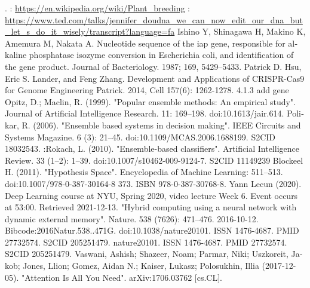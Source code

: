 \documentclass[12pt,a4paper,BCOR=.7cm,headsepline,bibliography=totoc]{report}
\begin{document}
\begin{thebibliography}{1}
\begin{latin}
. 
: \href{https://en.wikipedia.org/wiki/Plant_breeding}{\url{https://en.wikipedia.org/wiki/Plant_breeding}}
: \href{https://www.ted.com/talks/jennifer_doudna_we_can_now_edit_our_dna_but_let_s_do_it_wisely/transcript?language=fa}{\url{https://www.ted.com/talks/jennifer_doudna_we_can_now_edit_our_dna_but_let_s_do_it_wisely/transcript?language=fa}}
 { Ishino Y, Shinagawa H, Makino K, Amemura M, Nakata A. Nucleotide sequence of the iap gene, responsible for alkaline phosphatase isozyme conversion in Escherichia coli, and identification of the gene product. Journal of Bacteriology. 1987; 169, 5429–5433.}
 {Patrick D. Hsu, Eric S. Lander, and Feng Zhang. Development and Applications of CRISPR-Cas9 for Genome Engineering Patrick. 2014, Cell 157(6): 1262-1278.
 4.1.3 add gene}
 {Opitz, D.; Maclin, R. (1999). "Popular ensemble methods: An empirical study". Journal of Artificial Intelligence Research. 11: 169–198. doi:10.1613/jair.614.}
 {Polikar, R. (2006). "Ensemble based systems in decision making". IEEE Circuits and Systems Magazine. 6 (3): 21–45. doi:10.1109/MCAS.2006.1688199. S2CID 18032543.}
:{Rokach, L. (2010). "Ensemble-based classifiers". Artificial Intelligence Review. 33 (1–2): 1–39. doi:10.1007/s10462-009-9124-7. S2CID 11149239}
 {Blockeel H. (2011). "Hypothesis Space". Encyclopedia of Machine Learning: 511–513. doi:10.1007/978-0-387-30164-8 373. ISBN 978-0-387-30768-8.}
 {Yann Lecun (2020). Deep Learning course at NYU, Spring 2020, video lecture Week 6. Event occurs at 53:00. Retrieved 2021-12-13.}
 {"Hybrid computing using a neural network with dynamic external memory". Nature. 538 (7626): 471–476. 2016-10-12. Bibcode:2016Natur.538..471G. doi:10.1038/nature20101. ISSN 1476-4687. PMID 27732574. S2CID 205251479.}
 {nature20101. ISSN 1476-4687. PMID 27732574. S2CID 205251479.}
 { Vaswani, Ashish; Shazeer, Noam; Parmar, Niki; Uszkoreit, Jakob; Jones, Llion; Gomez, Aidan N.; Kaiser, Lukasz; Polosukhin, Illia (2017-12-05). "Attention Is All You Need". arXiv:1706.03762 [cs.CL].}

\end{latin}
\end{thebibliography}
\end{document}

